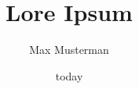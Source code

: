 
% 
\author{Max Musterman} %
\def\MatrNummer{00000} %
\def\Studiengang{IT}  %
\def\Email{Max-MusterMan@Leibniz-Fh}

\def\Pruefer{Prof. Max Musterman}  %
\def\ZweitGutachter{} %
\def\ArtArbeit{} %
\title{Lore Ipsum} %


\date{today}

\def\Firma{} %
\def\Hochschulname{Leibniz-Fachhochschule}


\def\Sperrvermerk{0} %
